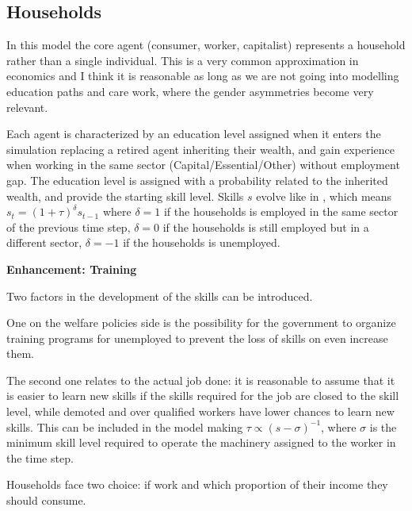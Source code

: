 \documentclass[a4paper, headings=standardclasses]{scrartcl}
\newenvironment{enh}[1][]{\begin{framed}\noindent\textbf{Enhancement: #1}\par}{\end{framed}}
\begin{document}
\subsection{Households}
In this model the core agent (consumer, worker, capitalist) represents a household rather than a single individual. This is a very common approximation in economics and I think it is reasonable as long as we are not going into modelling education paths and care work, where the gender asymmetries become very relevant.

Each agent is characterized by an education level assigned when it enters the simulation replacing a retired agent inheriting their wealth, and gain experience when working in the same sector (Capital/Essential/Other) without employment gap.
The education level is assigned with a probability related to the inherited wealth, and provide the starting skill level.
Skills $s$ evolve like in \textcite{dosi2018}, which means $s_t = (1+\tau)^\delta s_{t-1}$ where $\delta=1$ if the households is employed in the same sector of the previous time step, $\delta=0$ if the households is still employed but in a different sector, $\delta=-1$ if the households is unemployed.

\begin{enh}[Training]
	Two factors in the development of the skills can be introduced.

	One on the welfare policies side is the possibility for the government to organize training programs for unemployed to prevent the loss of skills on even increase them.

	The second one relates to the actual job done: it is reasonable to assume that it is easier to learn new skills if the skills required for the job are closed to the skill level, while demoted and over qualified workers have lower chances to learn new skills. This can be included in the model making $\tau \propto (s-\sigma)^{-1}$, where $\sigma$ is the minimum skill level required to operate the machinery assigned to the worker in the time step.
\end{enh}

Households face two choice: if work and which proportion of their income they should consume.
\end{document}
